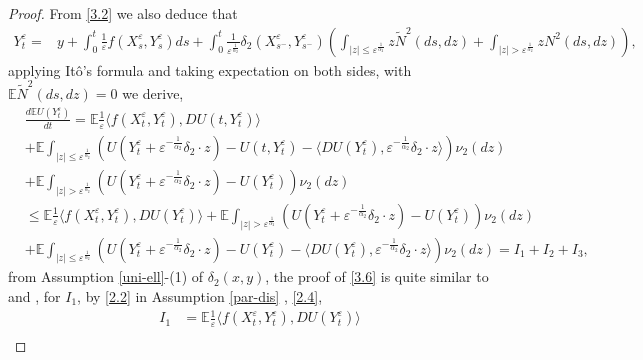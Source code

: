 \documentclass[11pt,reqno]{amsart}
\numberwithin{equation}{section}
\newcommand{\de}{\delta}
\begin{document}
\begin{proof}
	
	From \eqref{3.2} we also deduce that 
	\begin{align*}
			Y_{t}^{\varepsilon}=&y+\int_{0}^{t}\frac{1}{\varepsilon}f(X_{s}^{\varepsilon},Y_{s}^{\varepsilon})ds+\int_{0}^{t}\frac{1}{\varepsilon^{\frac{1}{\alpha_{2}}}}\delta_{2}(X_{s^{-}}^{\varepsilon},Y_{s^{-}}^{\varepsilon})\left( \int_{|z|\leq \varepsilon^{\frac{1}{\alpha_{2}}}}z \tilde{N}^{2}(ds,dz)+\int_{|z|> \varepsilon^{\frac{1}{\alpha_{2}}}}zN^{2}(ds,dz)\right),
	\end{align*}
	applying It\^{o}'s formula and taking expectation on both sides, with $\mathbb{E}\tilde{N}^{2}(ds,dz)=0$ we derive,
	\begin{align*}
	&\frac{d\mathbb{E}U(Y_{t}^{\varepsilon})}{dt}=\mathbb{E} \frac{1}{\varepsilon}\langle  f(X_{t}^{\varepsilon},Y_{t}^{\varepsilon}),DU(t,Y_{t}^{\varepsilon})\rangle  \\
		&+\mathbb{E} \int_{|z|\leq \varepsilon^{\frac{1}{\alpha_{2}}}}\left( U(Y_{t}^{\varepsilon}+\varepsilon^{-\frac{1}{\alpha_{2}}}\delta_{2}\cdot  z)-U(t,Y_{t}^{\varepsilon})-\langle  DU(Y_{t}^{\varepsilon}), \varepsilon^{-\frac{1}{\alpha_{2}}}\delta_{2}\cdot z\rangle  \right) \nu_{2}(dz)\\
		&+\mathbb{E} \int_{|z|> \varepsilon^{\frac{1}{\alpha_{2}}}}\left( U(Y_{t}^{\varepsilon}+\varepsilon^{-\frac{1}{\alpha_{2}}}\delta_{2}\cdot z)-U(Y_{t}^{\varepsilon}) \right) \nu_{2}(dz)\\
		&\leq \mathbb{E} \frac{1}{\varepsilon}\langle  f(X_{t}^{\varepsilon},Y_{t}^{\varepsilon}),DU(Y_{t}^{\varepsilon})\rangle  +\mathbb{E} \int_{|z|> \varepsilon^{\frac{1}{\alpha_{2}}}}\left( U(Y_{t}^{\varepsilon}+\varepsilon^{-\frac{1}{\alpha_{2}}}\delta_{2}\cdot z)-U(Y_{t}^{\varepsilon}) \right) \nu_{2}(dz)\\
		&+\mathbb{E} \int_{|z|\leq \varepsilon^{\frac{1}{\alpha_{2}}}}\left( U(Y_{t}^{\varepsilon}+\varepsilon^{-\frac{1}{\alpha_{2}}}\delta_{2}\cdot z)-U(Y_{t}^{\varepsilon})-\langle DU(Y_{t}^{\varepsilon}), \varepsilon^{-\frac{1}{\alpha_{2}}}\delta_{2}\cdot z \rangle  \right) \nu_{2}(dz)=I_{1}+I_{2}+I_{3},
	\end{align*}
from Assumption \ref{uni-ell}-(1) of $\de_2(x,y)$, the proof of \eqref{3.6} is quite similar to  \cite[Lemma A.1]{SXX} and \cite[Theorem 3.2]{KY},	for $I_{1}$, by  \eqref{2.2} in Assumption \ref{par-dis} , \eqref{2.4}, 
\begin{align*}
I_{1}&=\mathbb{E} \frac{1}{\varepsilon}\langle  f(X_{t}^{\varepsilon},Y_{t}^{\varepsilon}),DU(Y_{t}^{\varepsilon})\rangle \\

\end{align*}
\end{proof}
\end{document}
